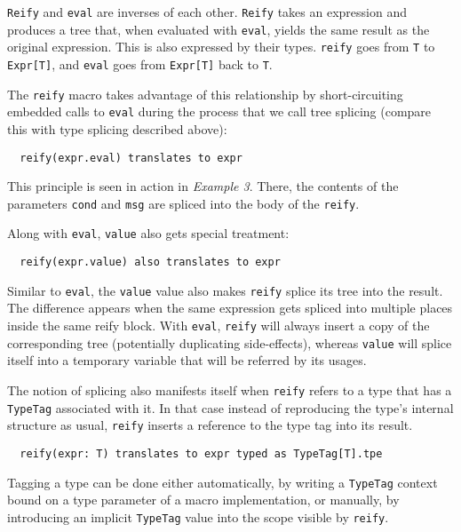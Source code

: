 \documentclass{llncs}
\begin{document}
\lstinline$Reify$ and \lstinline$eval$ are inverses of each other. \lstinline$Reify$ takes an expression and produces a tree that, when evaluated with \lstinline$eval$, yields the same result as the original expression. This is also expressed by their types. \lstinline$reify$ goes from \lstinline$T$ to \lstinline$Expr[T]$, and \lstinline$eval$ goes from \lstinline$Expr[T]$ back to \lstinline$T$.

The \lstinline$reify$ macro takes advantage of this relationship by short-circuiting embedded calls to \lstinline$eval$ during the process that we call tree splicing (compare this with type splicing described above):

\begin{lstlisting}
  reify(expr.eval) translates to expr
\end{lstlisting}

This principle is seen in action in \emph{Example 3}. There, the contents of the parameters \lstinline$cond$ and \lstinline$msg$ are spliced into the body of the \lstinline$reify$.

Along with \lstinline$eval$, \lstinline$value$ also gets special treatment:

\begin{lstlisting}
  reify(expr.value) also translates to expr
\end{lstlisting}

Similar to \lstinline$eval$, the \lstinline$value$ value also makes \lstinline$reify$ splice its tree into the result. The difference appears when the same expression gets spliced into multiple places inside the same reify block. With \lstinline$eval$, \lstinline$reify$ will always insert a copy of the corresponding tree (potentially duplicating side-effects), whereas \lstinline$value$ will splice itself into a temporary variable that will be referred by its usages.

The notion of splicing also manifests itself when \lstinline$reify$ refers to a type that has a \lstinline$TypeTag$ associated with it. In that case instead of reproducing the type’s internal structure as usual, \lstinline$reify$ inserts a reference to the type tag into its result.

\begin{lstlisting}
  reify(expr: T) translates to expr typed as TypeTag[T].tpe
\end{lstlisting}

Tagging a type can be done either automatically, by writing a \lstinline$TypeTag$ context bound on a type parameter of a macro implementation, or manually, by introducing an implicit \lstinline$TypeTag$ value into the scope visible by \lstinline$reify$.
\end{document}
